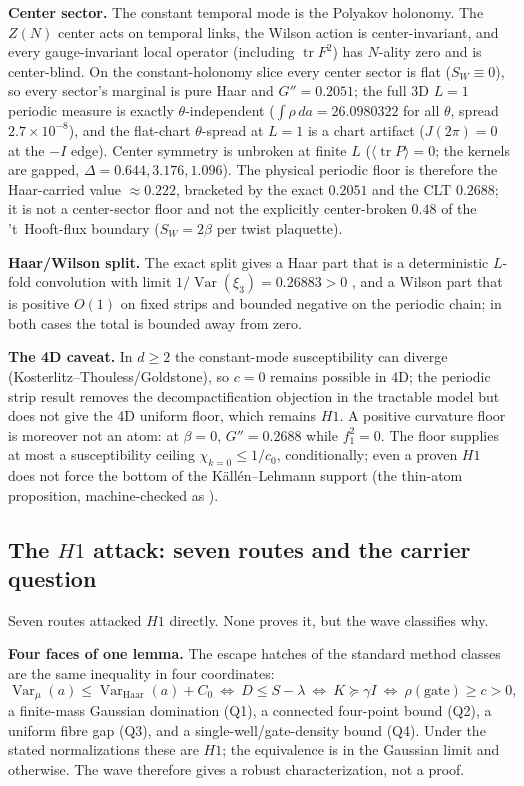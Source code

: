 \documentclass[11pt,a4paper]{article}
\newcommand{\labb}[2]{\fcolorbox{#1!35}{#1!8}{\textcolor{#1}{\textbf{\scriptsize #2}}}}
\newcommand{\LT}{\labb{cT}{T}}
\newcommand{\LC}{\labb{cC}{C}}
\newcommand{\code}[1]{\texttt{\footnotesize\detokenize{#1}}}
\begin{document}
\textbf{Center sector.} The constant temporal mode is the Polyakov holonomy. The $Z(N)$ center acts on
temporal links, the Wilson action is center-invariant, and every gauge-invariant local operator
(including $\operatorname{tr}F^2$) has $N$-ality zero and is center-blind. On the constant-holonomy
slice every center sector is flat ($S_W\equiv0$), so every sector's marginal is pure Haar and
$G''=0.2051$; the full $3$D $L=1$ periodic measure is exactly $\theta$-independent
($\int\rho\,da=26.0980322$ for all $\theta$, spread $2.7\times10^{-8}$), and the flat-chart
$\theta$-spread at $L=1$ is a chart artifact ($J(2\pi)=0$ at the $-I$ edge). Center symmetry is
unbroken at finite $L$ ($\langle\operatorname{tr}P\rangle=0$; the kernels are gapped,
$\Delta=0.644,3.176,1.096$). The physical periodic floor is therefore the Haar-carried value
$\approx0.222$, bracketed by the exact $0.2051$ and the CLT $0.2688$; it is not a center-sector floor
and not the explicitly center-broken $0.48$ of the 't~Hooft-flux boundary ($S_W=2\beta$ per twist
plaquette).

\textbf{Haar/Wilson split.} The exact split gives a Haar part that is a deterministic $L$-fold
convolution with limit $1/\operatorname{Var}(\xi_3)=0.26883>0$ \LT, and a Wilson part that is
positive $O(1)$ on fixed strips and bounded negative on the periodic chain; in both cases the total
is bounded away from zero.

\textbf{The 4D caveat.} In $d\ge2$ the constant-mode susceptibility can diverge
(Kosterlitz--Thouless/Goldstone), so $c=0$ remains possible in 4D; the periodic strip result removes
the decompactification objection in the tractable model but does not give the 4D uniform floor, which
remains $H1$. A positive curvature floor is moreover not an atom: at $\beta=0$, $G''=0.2688$ while
$f_1^2=0$. The floor supplies at most a susceptibility ceiling
$\chi_{k=0}\le1/c_0$, conditionally; even a proven $H1$ does not force the bottom of the
K\"all\'en--Lehmann support (the thin-atom proposition, machine-checked as
\code{H1\_does\_not\_imply\_atom}).

\subsection{The $H1$ attack: seven routes and the carrier question}
\label{sec:h1attack}

Seven routes attacked $H1$ directly. None proves it, but the wave classifies why.

\textbf{Four faces of one lemma.} The escape hatches of the standard method classes are the same
inequality in four coordinates:
\begin{equation}
  \operatorname{Var}_\mu(a)\le\operatorname{Var}_{\mathrm{Haar}}(a)+C_0
  \ \Longleftrightarrow\
  D\le S-\lambda
  \ \Longleftrightarrow\
  K\succeq\gamma I
  \ \Longleftrightarrow\
  \rho(\text{gate})\ge c>0,
  \label{eq:fourfaces}
\end{equation}
a finite-mass Gaussian domination (Q1), a connected four-point bound (Q2), a uniform fibre gap (Q3),
and a single-well/gate-density bound (Q4). Under the stated normalizations these are $H1$; the
equivalence is \LT{} in the Gaussian limit and \LC{} otherwise. The wave therefore gives a robust
characterization, not a proof.
\end{document}

